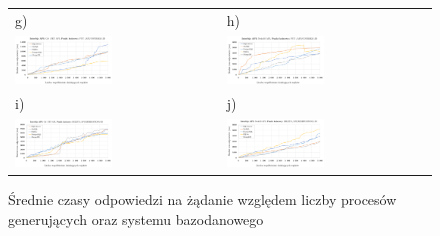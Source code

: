 \begin{figure}[htb]
\begin{tabular}{@{}ll@{}}
    g) & h) \\
    \includegraphics[width=0.49\textwidth]{rys05/response-dotnet-updateCourse.pdf} & \includegraphics[width=0.49\textwidth]{rys05/response-nodejs-updateCourse.pdf} \\
    i) & j) \\
    \includegraphics[width=0.49\textwidth]{rys05/response-dotnet-deleteReservation.pdf} & \includegraphics[width=0.49\textwidth]{rys05/response-nodejs-deleteReservation.pdf} \\
	\end{tabular}
  \caption{Średnie czasy odpowiedzi na żądanie względem liczby procesów generujących oraz systemu bazodanowego}
  \label{fig:response-mtc-1}
\end{figure}


